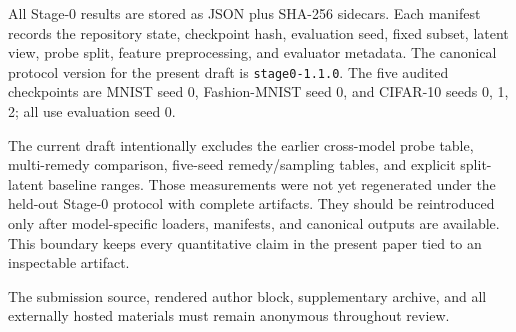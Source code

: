 All Stage-0 results are stored as JSON plus SHA-256 sidecars.  Each manifest
records the repository state, checkpoint hash, evaluation seed, fixed subset,
latent view, probe split, feature preprocessing, and evaluator metadata.  The
canonical protocol version for the present draft is
\texttt{stage0-1.1.0}.  The five audited checkpoints are MNIST seed 0,
Fashion-MNIST seed 0, and CIFAR-10 seeds 0, 1, 2; all use evaluation seed 0.

The current draft intentionally excludes the earlier cross-model probe table,
multi-remedy comparison, five-seed remedy/sampling tables, and explicit
split-latent baseline ranges.  Those measurements were not yet regenerated
under the held-out Stage-0 protocol with complete artifacts.  They should be
reintroduced only after model-specific loaders, manifests, and canonical
outputs are available.  This boundary keeps every quantitative claim in the
present paper tied to an inspectable artifact.

The submission source, rendered author block, supplementary archive, and all
externally hosted materials must remain anonymous throughout review.
